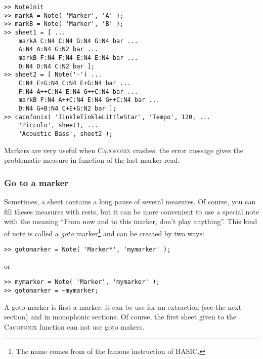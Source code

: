 \documentclass{article}
\newcommand{\cacofonix}{\textsc{Cacofonix}\xspace}
\begin{document}

\begin{lstlisting}
>> NoteInit
>> markA = Note( 'Marker', 'A' );
>> markB = Note( 'Marker', 'B' );
>> sheet1 = [ ...
	markA C:N4 C:N4 G:N4 G:N4 bar ...
	A:N4 A:N4 G:N2 bar ...
	markB F:N4 F:N4 E:N4 E:N4 bar ...
	D:N4 D:N4 C:N2 bar ];
>> sheet2 = [ Note('-') ...
	C:N4 E+G:N4 C:N4 E+G:N4 bar ...
	F:N4 A++C:N4 E:N4 G++C:N4 bar ...
	markB F:N4 A++C:N4 E:N4 G++C:N4 bar ...
	D:N4 G+B:N4 C+E+G:N2 bar ];
>> cacofonix( 'TinkleTinkleLittleStar', 'Tempo', 120, ...
	'Piccolo', sheet1, ...
	'Acoustic Bass', sheet2 );
\end{lstlisting}

Markers are very useful when \cacofonix crashes: the error message gives the problematic measure in function of the last marker read.

\subsubsection{Go to a marker}
\label{sec:Goto}

Sometimes, a sheet contains a long pause of several measures. Of course, you can fill theses measures with rests, but it can be more convenient to use a special note with the meaning ``From now and to this marker, don't play anything''. This kind of note is called a \emph{goto} marker\footnote{The name comes from of the famous instruction of BASIC.} and can be created by two ways: 
\begin{lstlisting}
>> gotomarker = Note( 'Marker*', 'mymarker' );
\end{lstlisting}
or
\begin{lstlisting}
>> mymarker = Note( 'Marker', 'mymarker' );
>> gotomarker = ~mymarker;
\end{lstlisting}

A goto marker is first a marker: it can be use for an extraction (see the next section) and in monophonic sections. Of course, the first sheet given to the \cacofonix function can not use goto makers.

\end{document}
